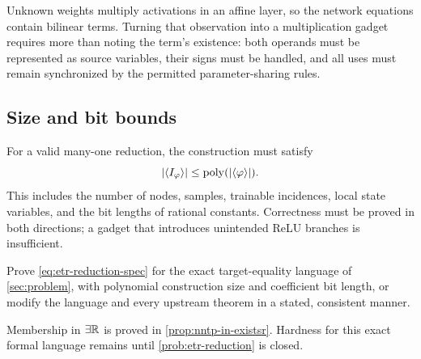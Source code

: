 Unknown weights multiply activations in an affine layer, so the network
equations contain bilinear terms.  Turning that observation into a multiplication
gadget requires more than noting the term's existence: both operands must be
represented as source variables, their signs must be handled, and all uses
must remain synchronized by the permitted parameter-sharing rules.

\subsection{Size and bit bounds}

For a valid many-one reduction, the construction must satisfy
\begin{equation}
  |\langle I_\varphi\rangle|
  \le \operatorname{poly}(|\langle\varphi\rangle|).
\end{equation}
This includes the number of nodes, samples, trainable incidences, local state
variables, and the bit lengths of rational constants.  Correctness must be
proved in both directions; a gadget that introduces unintended ReLU branches
is insufficient.

\begin{problem}
\label{prob:etr-reduction}
Prove \cref{eq:etr-reduction-spec} for the exact target-equality language of
\cref{sec:problem}, with polynomial construction size and coefficient bit
length, or modify the language and every upstream theorem in a stated,
consistent manner.
\end{problem}

\begin{remark}
Membership in \(\exists\mathbb{R}\) is proved in \cref{prop:nntp-in-existsr}.  Hardness
for this exact formal language remains \openstatus until
\cref{prob:etr-reduction} is closed.
\end{remark}
